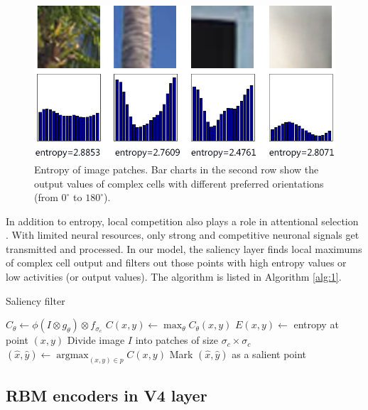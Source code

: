\documentclass[10pt]{article}
\begin{document}
\begin{figure}
\centerline{\includegraphics[width=0.8\linewidth]{images/fig5.jpg}} 
\caption{Entropy of image patches.
Bar charts in the second row show the output values of complex cells
with different preferred orientations (from $0^\circ$ to $180^\circ$).}
\label{fig:5}
\end{figure}

In addition to entropy, local competition also plays a role in attentional selection \cite{desimone1995}.
With limited neural resources, only strong and competitive neuronal signals get transmitted and processed.
In our model, the saliency layer finds local maximums of complex cell output
and filters out those points with high entropy values or low activities (or output values).
The algorithm is listed in Algorithm \ref{alg:1}.

\begin{algorithm}
  \caption{Saliency filter}
  \label{alg:1}
  \begin{algorithmic}[1]
        \State $C_{\theta}\leftarrow\phi(I\otimes g_{\theta})\otimes f_{\sigma_c}$
      \EndFor
        \State $C(x,y)\leftarrow\max_{\theta}C_{\theta}(x,y)$
        \State $E(x,y)\leftarrow$ entropy at point $(x,y)$
      \EndFor
      \State Divide image $I$ into patches of size $\sigma_c\times\sigma_c$
        \State $(\hat{x},\hat{y})\leftarrow\operatorname{argmax}_{(x,y)\in p}C(x,y)$
          \State Mark $(\hat{x},\hat{y})$ as a salient point
        \EndIf
      \EndFor
    \EndProcedure
  \end{algorithmic}
\end{algorithm}

\subsection{RBM encoders in V4 layer}
\end{document}
